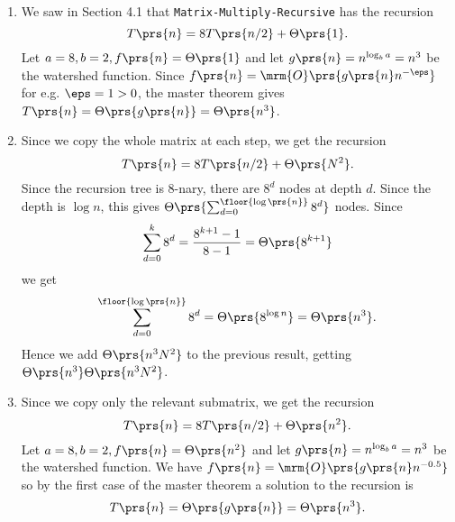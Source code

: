 \documentclass[oneside]{scrbook}
\newcommand{\codeword}[1]{\texttt{#1}}
\theoremstyle{definition}
\begin{document}
\begin{problem}
\begin{enumerate}[label=\alph*.]
\begin{enumerate}[label=\arabic*.]
\item %
We saw in Section 4.1 that \codeword{Matrix-Multiply-Recursive} has the recursion
\[T\prs{n} = 8 T\prs{n/2} + \Theta\prs{1} \text{.}\]
Let $a = 8, b = 2, f\prs{n} = \Theta\prs{1}$ and let $g\prs{n} = n^{\log_b a} = n^3$ be the watershed function. Since $f\prs{n} = \mrm{O}\prs{g\prs{n} n^{-\eps}}$ for e.g. $\eps = 1 > 0$, the master theorem gives $T\prs{n} = \Theta\prs{g\prs{n}} = \Theta\prs{n^3}$.
\item %
Since we copy the whole matrix at each step, we get the recursion
\[T\prs{n} = 8 T\prs{n/2} + \Theta\prs{N^2} \text{.}\]
Since the recursion tree is $8$-nary, there are $8^d$ nodes at depth $d$. Since the depth is $\log n$, this gives $\Theta\prs{\sum_{d=0}^{\floor{\log\prs{n}}} 8^d}$ nodes.
Since
\begin{align*}
\sum_{d=0}^k 8^d = \frac{8^{k+1} - 1}{8 - 1} = \Theta\prs{8^{k+1}}
\end{align*}
we get
\begin{align*}
\sum_{d=0}^{\floor{\log\prs{n}}} 8^d = \Theta\prs{8^{\log n}} = \Theta\prs{n^3} \text{.}
\end{align*}
Hence we add $\Theta\prs{n^3 N^2}$ to the previous result, getting $\Theta\prs{n^3} \Theta\prs{n^3 N^2}$.
\item %
Since we copy only the relevant submatrix, we get the recursion
\[T\prs{n} = 8 T\prs{n/2} + \Theta\prs{n^2} \text{.}\]
Let $a = 8, b = 2, f\prs{n} = \Theta\prs{n^2}$ and let $g\prs{n} = n^{\log_b a} = n^3$ be the watershed function. We have $f\prs{n} = \mrm{O}\prs{g\prs{n} n^{-0.5}}$ so by the first case of the master theorem a solution to the recursion is
\[T\prs{n} = \Theta\prs{g\prs{n}} = \Theta\prs{n^3} \text{.}\]
\end{enumerate}
\end{enumerate}
\end{problem}
\end{document}
